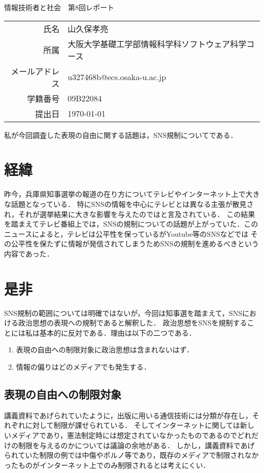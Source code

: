 \documentclass[dvipdfmx]{jarticle}
\begin{document}
\begin{titlepage}
    \begin{center}
        {\huge 情報技術者と社会　第8回レポート}
        \vspace{180pt}\\
        \begin{tabular}{rl}
            氏名 & 山久保孝亮\\
            所属 & 大阪大学基礎工学部情報科学科ソフトウェア科学コース\\
            メールアドレス & u327468b@ecs.osaka-u.ac.jp\\
            学籍番号 & 09B22084\\
            提出日 & \today\\
        \end{tabular}
    \end{center}
\end{titlepage}
私が今回調査した表現の自由に関する話題は，SNS規制についてである．
\section{経緯}
昨今，兵庫県知事選挙の報道の在り方についてテレビやインターネット上で大きな話題となっている．
特にSNSの情報を中心にテレビとは異なる主張が散見され，それが選挙結果に大きな影響を与えたのではと言及されている．
この結果を踏まえてテレビ番組上では，SNSの規制についての話題が上がっていた．\cite{0}このニュースによると，テレビは公平性を保っているがYoutube等のSNSなどでは
その公平性を保たずに情報が発信されてしまうためSNSの規制を進めるべきという内容であった．
\section{是非}
SNS規制の範囲については明確ではないが，今回は知事選を踏まえて，SNSにおける政治思想の表現への規制であると解釈した．
政治思想をSNSを規制することには私は基本的に反対である．理由は以下の二つである．
\begin{enumerate}
    \item 表現の自由への制限対象に政治思想は含まれないはず．
    \item 情報の偏りはどのメディアでも発生する．
\end{enumerate}
\subsection{表現の自由への制限対象}
講義資料であげられていたように，出版に用いる通信技術には分類が存在し，それぞれに対して制限が課せられている．
そしてインターネットに関しては新しいメディアであり，憲法制定時には想定されていなかったものであるのでどれだけの制限を与えるのかについては議論の余地がある．
しかし，講義資料であげられていた制限の例では中傷やポルノ等であり\cite{1}，既存のメディアで制限されなかったものがインターネット上でのみ制限されるとは考えにくい．
\end{document}
